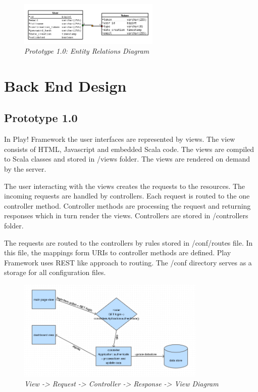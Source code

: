 \documentclass[12pt,twoside,a4paper]{report}
\begin{document}
\begin{figure}[!ht]
	\centering
		\includegraphics[width=0.6\textwidth, totalheight=4.5cm]
		{entity_relations_diagram1}
	\caption{\textit{Prototype 1.0: Entity Relations Diagram}}
	\label{f3.8.1}
\end{figure}

\section{Back End Design}\label{3.9}
\subsection{Prototype 1.0}\label{3.9.1}
In Play! Framework the user interfaces are represented by views. The view consists of HTML, Javascript and embedded Scala\cite{30} code. The views are compiled to Scala classes and stored in /views folder. The views are rendered on demand by the server.

The user interacting with the views creates the requests to the resources. The incoming requests are handled by controllers. Each request is routed to the one controller method. Controller methods are processing the request and returning responses which in turn render the views. Controllers are stored in /controllers folder.

The requests are routed to the controllers by rules stored in /conf/routes file. In this file, the mappings form URIs to controller methods are defined. Play Framework uses REST like approach to routing. The /conf directory serves as a storage for all configuration files.

\begin{figure}[!ht]
	\centering
		\includegraphics[width=0.8\textwidth, totalheight=7cm]
		{play_flowchart}
	\caption{\textit{View -> Request -> Controller -> Response -> View Diagram}}
	\label{f3.9.2}
\end{figure}
\end{document}
